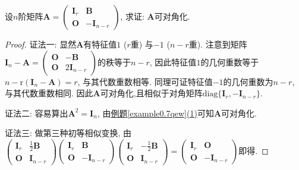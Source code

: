 \documentclass[../../main.tex]{subfiles}
\begin{document}
\begin{example}
设\(n\)阶矩阵\(\boldsymbol{A} = \begin{pmatrix}
\boldsymbol{I}_r&\boldsymbol{B}\\
\boldsymbol{O}&-\boldsymbol{I}_{n - r}
\end{pmatrix}\), 求证: \(\boldsymbol{A}\)可对角化.
\end{example}
\begin{proof}
{\color{blue}证法一:}
显然\(\boldsymbol{A}\)有特征值\(1\) (\(r\)重) 与\(-1\) (\(n - r\)重). 注意到矩阵\(\boldsymbol{I}_n - \boldsymbol{A} = \begin{pmatrix}
\boldsymbol{O}&-\boldsymbol{B}\\
\boldsymbol{O}&2\boldsymbol{I}_{n - r}
\end{pmatrix}\)的秩等于\(n - r\), 因此特征值\(1\)的几何重数等于\(n - \mathrm{r}(\boldsymbol{I}_n - \boldsymbol{A}) = r\), 与其代数重数相等. 同理可证特征值\(-1\)的几何重数为\(n - r\), 与其代数重数相同. 因此\(\boldsymbol{A}\)可对角化,且相似于对角矩阵\(\mathrm{diag}\{\boldsymbol{I}_r,-\boldsymbol{I}_{n - r}\}\). 

{\color{blue}证法二:}
容易算出\(\boldsymbol{A}^2 = \boldsymbol{I}_n\), 由\hyperref[example0.7qew]{例题\ref{example0.7qew}(1)}可知\(\boldsymbol{A}\)可对角化.

{\color{blue}证法三:}
做第三种初等相似变换,
由\(\begin{pmatrix}
\boldsymbol{I}_r&\frac{1}{2}\boldsymbol{B}\\
\boldsymbol{O}&\boldsymbol{I}_{n - r}
\end{pmatrix}
\begin{pmatrix}
\boldsymbol{I}_r&\boldsymbol{B}\\
\boldsymbol{O}&-\boldsymbol{I}_{n - r}
\end{pmatrix}
\begin{pmatrix}
\boldsymbol{I}_r&-\frac{1}{2}\boldsymbol{B}\\
\boldsymbol{O}&\boldsymbol{I}_{n - r}
\end{pmatrix}
=
\begin{pmatrix}
\boldsymbol{I}_r&\boldsymbol{O}\\
\boldsymbol{O}&-\boldsymbol{I}_{n - r}
\end{pmatrix}\)即得. 
\end{proof}
\end{document}
